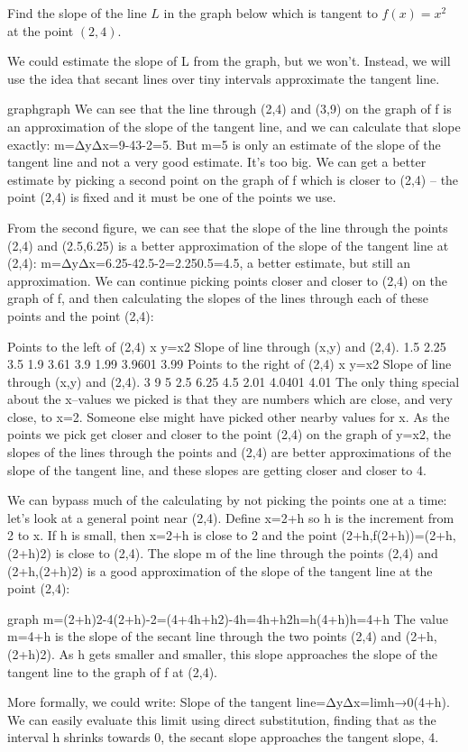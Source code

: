 \begin{example}
Find the slope of the line $L$ in the graph below which is tangent to $f(x)=x^2$ at the point $(2,4)$.

\begin{solution} We could estimate the slope of L from the graph, but we won't. Instead, we will use the idea that secant lines over tiny intervals approximate the tangent line.

graphgraph
We can see that the line through (2,4) and (3,9) on the graph of f is an approximation of the slope of the tangent line, and we can calculate that slope exactly: m=ΔyΔx=9-43-2=5. But m=5 is only an estimate of the slope of the tangent line and not a very good estimate. It's too big. We can get a better estimate by picking a second point on the graph of f which is closer to (2,4) – the point (2,4) is fixed and it must be one of the points we use.

From the second figure, we can see that the slope of the line through the points (2,4) and (2.5,6.25) is a better approximation of the slope of the tangent line at (2,4): m=ΔyΔx=6.25-42.5-2=2.250.5=4.5, a better estimate, but still an approximation. We can continue picking points closer and closer to (2,4) on the graph of f, and then calculating the slopes of the lines through each of these points and the point (2,4):

Points to the left of (2,4)
x	y=x2	Slope of line through (x,y) and (2,4).	1.5	2.25	3.5	1.9	3.61	3.9	1.99	3.9601	3.99
Points to the right of (2,4)
x	y=x2	Slope of line through (x,y) and (2,4).	3	9	5	2.5	6.25	4.5	2.01	4.0401	4.01
The only thing special about the x–values we picked is that they are numbers which are close, and very close, to x=2. Someone else might have picked other nearby values for x. As the points we pick get closer and closer to the point (2,4) on the graph of y=x2, the slopes of the lines through the points and (2,4) are better approximations of the slope of the tangent line, and these slopes are getting closer and closer to 4.

We can bypass much of the calculating by not picking the points one at a time: let's look at a general point near (2,4). Define x=2+h so h is the increment from 2 to x. If h is small, then x=2+h is close to 2 and the point (2+h,f(2+h))=(2+h,(2+h)2) is close to (2,4). The slope m of the line through the points (2,4) and (2+h,(2+h)2) is a good approximation of the slope of the tangent line at the point (2,4):

graph
m=(2+h)2-4(2+h)-2=(4+4h+h2)-4h=4h+h2h=h(4+h)h=4+h
The value m=4+h is the slope of the secant line through the two points (2,4) and (2+h,(2+h)2). As h gets smaller and smaller, this slope approaches the slope of the tangent line to the graph of f at (2,4).

More formally, we could write:
Slope of the tangent line=ΔyΔx=limh→0(4+h).
We can easily evaluate this limit using direct substitution, finding that as the interval h shrinks towards 0, the secant slope approaches the tangent slope, 4.
\end{solution}\end{example}

